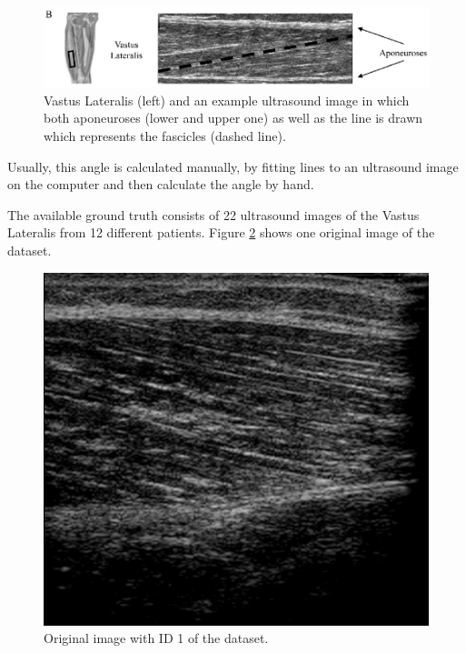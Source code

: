 \documentclass[10pt,twocolumn,letterpaper]{article}
\begin{document}
\begin{figure}
	\begin{center}		
		\includegraphics[width=1\linewidth]{img/VastusLateralis}
	\end{center}
	\caption{Vastus Lateralis (left) and an example ultrasound image in which both aponeuroses (lower and upper one) as well as the line is drawn which represents the fascicles (dashed line). \cite{NCronin13a}}
	\label{fig:VastusLateralis}
	
\end{figure}

Usually, this angle is calculated manually, by fitting lines to an ultrasound image on the computer and then calculate the angle by hand.

The available ground truth consists of 22 ultrasound images of the Vastus Lateralis from 12 different patients.
Figure \ref{fig:im1_orig} shows one original image of the dataset.

\begin{figure}
	\begin{center}		
		\includegraphics[width=1\linewidth]{img/im1_original}
	\end{center}
	\caption{Original image with ID 1 of the dataset.}
	\label{fig:im1_orig}
	
\end{figure}
\end{document}
